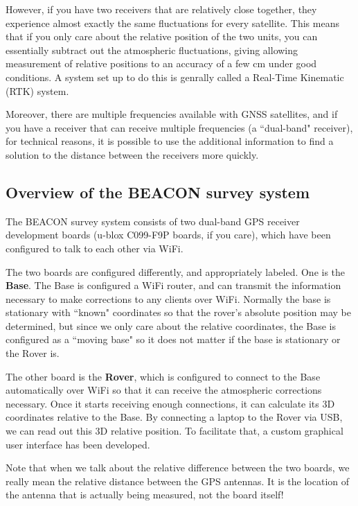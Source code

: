 \documentclass[usletter]{article}
\begin{document}
However, if you have two receivers that are relatively close together, they
experience almost exactly the same fluctuations for every satellite. This means
that if you only care about the relative position of the two units, you can
essentially subtract out the atmospheric fluctuations, giving allowing
measurement of relative positions to an accuracy of a few cm under good
conditions. A system set up to do this is genrally called a Real-Time Kinematic
(RTK) system. 

Moreover, there are multiple frequencies available with GNSS satellites, and
if you have a receiver that can receive multiple frequencies (a ``dual-band"
receiver), for technical reasons, it is possible to use the additional
information to find a solution to the distance between the receivers more
quickly.

\subsection{ Overview of the BEACON survey system} 

The BEACON survey system consists of two dual-band GPS receiver development
boards (u-blox C099-F9P boards, if you care), which have been  configured to talk to each other via WiFi.

The two boards are configured differently, and appropriately labeled. One is
the \textbf{Base}.  The Base is configured a WiFi router, and can transmit the information
necessary to make corrections to any clients over WiFi. Normally the base is stationary with ``known" coordinates so that the rover's absolute position may be determined, but since we only care about the relative coordinates, the Base is configured as a ``moving base"  so it does not matter if the base is stationary or the Rover is. 

The other board is the \textbf{Rover}, which is configured to connect to the
Base automatically over WiFi so that it can receive the atmospheric corrections
necessary. Once it starts receiving enough connections, it can calculate its 3D
coordinates relative to the Base. By connecting a laptop to the Rover via USB,
we can read out this 3D relative position. To facilitate that, a custom
graphical user interface has been developed. 

Note that when we talk about the relative difference between the two boards, we
really mean the relative distance between the GPS antennas. It is the location
of the antenna that is actually being measured, not the board itself! 
\end{document}

